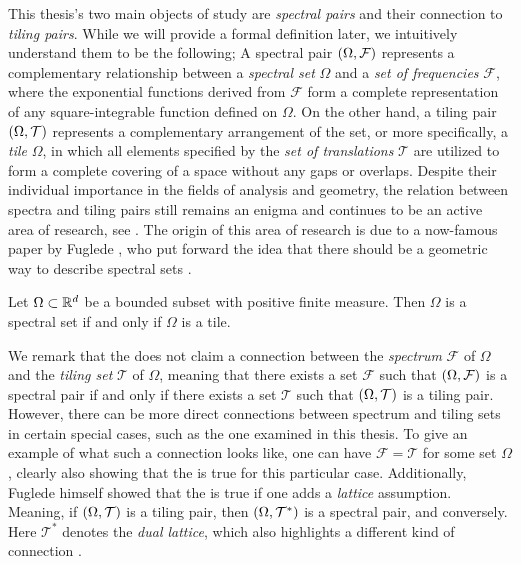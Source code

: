 \documentclass[../thesis.tex]{subfiles}
\begin{document}
This thesis's two main objects of study are \emph{spectral pairs} and their connection to \emph{tiling pairs}. While we will provide a formal definition later, we intuitively understand them to be the following; A spectral pair $(\Omega,\mathcal{F})$ represents a complementary relationship between a \emph{spectral set} $\Omega$ and a \emph{set of frequencies} $\mathcal{F}$, where the exponential functions derived from $\mathcal{F}$ form a complete representation of any square-integrable function defined on $\Omega$. On the other hand, a tiling pair $(\Omega,\mathcal{T})$ represents a complementary arrangement of the set, or more specifically, a \emph{tile} $\Omega$, in which all elements specified by the \emph{set of translations} $\mathcal{T}$ are utilized to form a complete covering of a space without any gaps or overlaps. Despite their individual importance in the fields of analysis and geometry, the relation between spectra and tiling pairs still remains an enigma and continues to be an active area of research, see \cite{levFugledeConjectureConvex2022,kissFugledeConjectureHolds2022}. The origin of this area of research is due to a now-famous paper by Fuglede \cite{fugledeCommutingSelfadjointPartial1974}, who put forward the idea that there should be a geometric way to describe spectral sets \cite{lagariasOrthonormalBasesExponentials2000,liDualityPropertiesSpectra2010}. 

\begin{conjecture}\label{conj:fuglede}  
    Let $\Omega\subset \mathbb{R}^d$ be a bounded subset with positive finite measure. Then $\Omega$ is a spectral set if and only if $\Omega$ is a tile. 
\end{conjecture}

We remark that the  does not claim a connection between the \emph{spectrum} $\mathcal{F}$ of $\Omega$ and the \emph{tiling set} $\mathcal{T}$ of $\Omega$, meaning that there exists a set $\mathcal{F}$ such that $(\Omega,\mathcal{F})$ is a spectral pair if and only if there exists a set $\mathcal{T}$ such that $(\Omega,\mathcal{T})$ is a tiling pair. However, there can be more direct connections between spectrum and tiling sets in certain special cases, such as the one examined in this thesis. To give an example of what such a connection looks like, one can have $\mathcal{F}=\mathcal{T}$ for some set $\Omega$, clearly also showing that the  is true for this particular case. Additionally, Fuglede himself showed that the  is true if one adds a \emph{lattice} assumption. Meaning, if $(\Omega,\mathcal{T})$ is a tiling pair, then $(\Omega,\mathcal{T^*})$ is a spectral pair, and conversely. Here $\mathcal{T^*}$ denotes the \emph{dual lattice}, which also highlights a different kind of connection \cite{fugledeCommutingSelfadjointPartial1974}.
\end{document}
